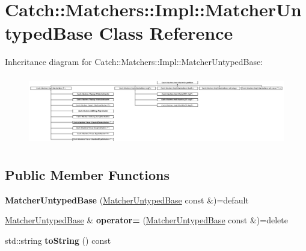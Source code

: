 \hypertarget{class_catch_1_1_matchers_1_1_impl_1_1_matcher_untyped_base}{}\section{Catch\+:\+:Matchers\+:\+:Impl\+:\+:Matcher\+Untyped\+Base Class Reference}
\label{class_catch_1_1_matchers_1_1_impl_1_1_matcher_untyped_base}
Inheritance diagram for Catch\+:\+:Matchers\+:\+:Impl\+:\+:Matcher\+Untyped\+Base\+:\begin{figure}[H]
\begin{center}
\leavevmode
\includegraphics[height=3.046489cm]{class_catch_1_1_matchers_1_1_impl_1_1_matcher_untyped_base}
\end{center}
\end{figure}
\subsection*{Public Member Functions}
\begin{DoxyCompactItemize}
\item 
\mbox{\label{class_catch_1_1_matchers_1_1_impl_1_1_matcher_untyped_base_a985fd3c3ffcc9f2e8dc7a330130040b0}} 
{\bfseries Matcher\+Untyped\+Base} (\mbox{\hyperlink{class_catch_1_1_matchers_1_1_impl_1_1_matcher_untyped_base}{Matcher\+Untyped\+Base}} const \&)=default
\item 
\mbox{\label{class_catch_1_1_matchers_1_1_impl_1_1_matcher_untyped_base_a62668ccc47b64a9094dcb6413f9af80b}} 
\mbox{\hyperlink{class_catch_1_1_matchers_1_1_impl_1_1_matcher_untyped_base}{Matcher\+Untyped\+Base}} \& {\bfseries operator=} (\mbox{\hyperlink{class_catch_1_1_matchers_1_1_impl_1_1_matcher_untyped_base}{Matcher\+Untyped\+Base}} const \&)=delete
\item 
\mbox{\label{class_catch_1_1_matchers_1_1_impl_1_1_matcher_untyped_base_a5982c7c80ca71dfe2298babadad7a453}} 
std\+::string {\bfseries to\+String} () const
\end{DoxyCompactItemize}
